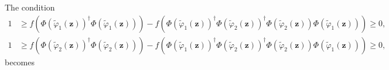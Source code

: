 \documentclass[aps,preprint]{revtex4}%
\begin{document}
The condition%
\begin{align}
1  &  \geq f\left(  \Phi\left(  \tilde{\varphi}_{1}\left(  \mathbf{z}\right)
\right)  ^{\dagger}\Phi\left(  \tilde{\varphi}_{1}\left(  \mathbf{z}\right)
\right)  \right)  -f\left(  \Phi\left(  \tilde{\varphi}_{1}\left(
\mathbf{z}\right)  \right)  ^{\dagger}\Phi\left(  \tilde{\varphi}_{2}\left(
\mathbf{z}\right)  \right)  ^{\dagger}\Phi\left(  \tilde{\varphi}_{2}\left(
\mathbf{z}\right)  \right)  \Phi\left(  \tilde{\varphi}_{1}\left(
\mathbf{z}\right)  \right)  \right)  \geq0,\nonumber\\
1  &  \geq f\left(  \Phi\left(  \tilde{\varphi}_{2}\left(  \mathbf{z}\right)
\right)  ^{\dagger}\Phi\left(  \tilde{\varphi}_{2}\left(  \mathbf{z}\right)
\right)  \right)  -f\left(  \Phi\left(  \tilde{\varphi}_{1}\left(
\mathbf{z}\right)  \right)  ^{\dagger}\Phi\left(  \tilde{\varphi}_{2}\left(
\mathbf{z}\right)  \right)  ^{\dagger}\Phi\left(  \tilde{\varphi}_{2}\left(
\mathbf{z}\right)  \right)  \Phi\left(  \tilde{\varphi}_{1}\left(
\mathbf{z}\right)  \right)  \right)  \geq0,
\end{align}
becomes%
\end{document}
